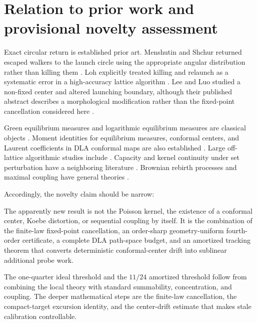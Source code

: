 \documentclass[11pt]{article}
\theoremstyle{mainthm}
\theoremstyle{definition}
\theoremstyle{remark}
\begin{document}
\section{Relation to prior work and provisional novelty assessment}

Exact circular return is established prior art. Menshutin and Shchur returned escaped walkers to the launch circle using the appropriate angular distribution rather than killing them \cite{MenshutinShchur2006}. Loh explicitly treated killing and relaunch as a systematic error in a high-accuracy lattice algorithm \cite{Loh2014}. Lee and Luo studied a non-fixed center and altered launching boundary, although their published abstract describes a morphological modification rather than the fixed-point cancellation considered here \cite{LeeLuo1992}.

Green equilibrium measures and logarithmic equilibrium measures are classical objects \cite{Ransford1995,SaffTotik1997,Pouliasis2013}. Moment identities for equilibrium measures, conformal centers, and Laurent coefficients in DLA conformal maps are also established \cite{BaernsteinEtAl2011,ClarkLaugesen2025,HastingsLevitov1998,DavidovitchEtAl1999,Pommerenke1992}. Large off-lattice algorithmic studies include \cite{TolmanMeakin1989}. Capacity and kernel continuity under set perturbation have a neighboring literature \cite{KalmykovKovalev2022,ClarkLaugesenRiesz2025}. Brownian rebirth processes and maximal coupling have general theories \cite{GrigorescuKang2007,Lindvall1992,Thorisson2000}.

Accordingly, the novelty claim should be narrow:

\begin{resultbox}
The apparently new result is not the Poisson kernel, the existence of a conformal center, Koebe distortion, or sequential coupling by itself. It is the combination of the finite-law fixed-point cancellation, an order-sharp geometry-uniform fourth-order certificate, a complete DLA path-space budget, and an amortized tracking theorem that converts deterministic conformal-center drift into sublinear additional probe work.
\end{resultbox}

The one-quarter ideal threshold and the $11/24$ amortized threshold follow from combining the local theory with standard summability, concentration, and coupling. The deeper mathematical steps are the finite-law cancellation, the compact-target excursion identity, and the center-drift estimate that makes stale calibration controllable.
\end{document}
